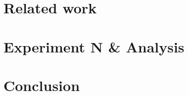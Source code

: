 \section{Related work}\label{sec:relatedwork}







\section{Experiment N \& Analysis}


\section{Conclusion}





\appendix
%

